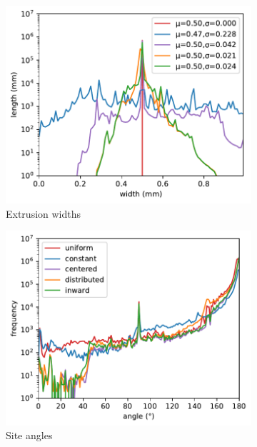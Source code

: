 \begin{figure}
\begin{subfigure}{\figwidth}\centering
\includegraphics[height=\figheight]{sources-validation-widths.pdf}
\caption{{Extrusion widths}}
\label{widthHistogram}
\end{subfigure}
\begin{subfigure}{\figwidth}\centering
\includegraphics[height=\figheight]{sources-validation-angles.pdf}
\caption{{Site angles}}
\label{smoothness}
\end{subfigure}
\begin{subfigure}{\figwidth}\centering

\end{subfigure}
\end{figure}
